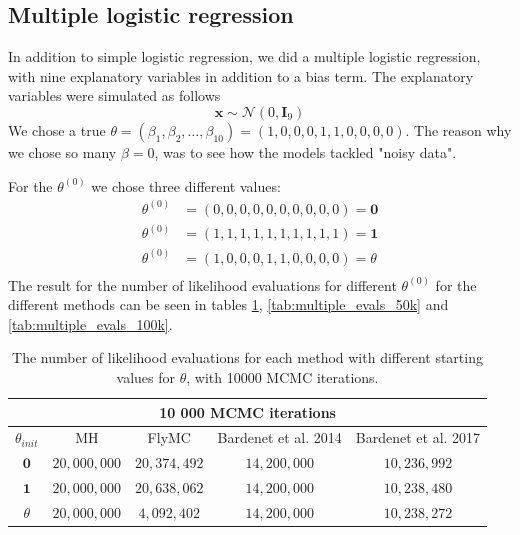 \subsection{Multiple logistic regression}\label{sec:experiments_multiple_log_reg}
In addition to simple logistic regression, we did a multiple logistic regression, with nine explanatory variables in addition to a bias term. The explanatory variables  
were simulated as follows
\begin{equation*}
    \mathbf{x} \sim \mathcal{N}\left(0,\mathbf{I}_9\right)
\end{equation*}
We chose a true $\theta = \left(\beta_1, \beta_2, \ldots, \beta_{10}\right) = \left(1, 0, 0 , 0, 1, 1, 0, 0, 0, 0\right)$. The reason why we chose so many $\beta = 0$, was to see how the models tackled "noisy data". 

For the $\theta^{\left(0\right)}$ we chose three different values: 
\begin{equation*}
\begin{split}
    \theta^{\left(0\right)} &= \left(0, 0, 0, 0, 0, 0, 0, 0, 0, 0\right) = \mathbf{0} \\
    \theta^{\left(0\right)} & = \left(1, 1, 1, 1, 1, 1, 1, 1, 1, 1 \right) = \mathbf{1} \\
    \theta^{\left(0\right)} & = \left(1, 0, 0, 0, 1, 1, 0, 0, 0, 0\right) = \theta \\
    \end{split}
\end{equation*}
The result for the number of likelihood evaluations for different $\theta^{\left(0\right)}$ for the different methods can be seen in tables \ref{tab:multiple_evals_10k}, \ref{tab:multiple_evals_50k} and \ref{tab:multiple_evals_100k}. 

\begin{table}
    \centering
\begin{tabular}{|c|c|c|c|c|}
  \hline
    \multicolumn{5}{|c|}{10 000 MCMC iterations} \\
    \hline
\hline

        $\theta_{init}$ &  MH & FlyMC & Bardenet et al. 2014 & Bardenet et al. 2017\\ 
         \hline \hline$\mathbf{0}$ & $20,000,000$ & $20,374,492$ & $14,200,000$ & $10,236,992$ \\
        $\mathbf{1}$ & $20,000,000$ & $20,638,062$ & $14,200,000$ & $10,238,480$ \\
        $\theta$ & $20,000,000$ & $4,092,402$ & $14,200,000$ & $10,238,272$
       
        \\ \hline
\end{tabular}
\caption{The number of likelihood evaluations for each method with different starting values for $\theta$, with 10000 MCMC iterations.}
\label{tab:multiple_evals_10k}
\end{table} 

